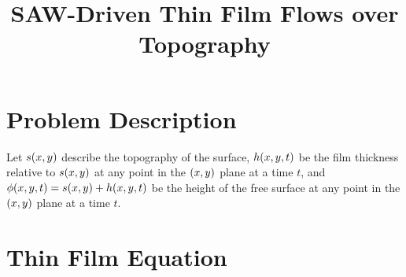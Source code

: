\documentclass[letterpaper]{article}
\title{SAW-Driven Thin Film Flows over Topography}
\date{}
\begin{document}
 
\maketitle

\section{Problem Description}

Let $s\!\left( x, y \right)$ describe the topography of the surface, 
$h\!\left( x,y,t \right)$ be the film thickness relative to $s\!\left( x,y \right)$ at any point in the $\left( x,y \right)$ plane at a time $t$, 
and $\phi\!\left( x,y,t \right) = s\!\left( x,y \right) + h\!\left( x,y,t \right)$ be the height of the free surface at any point in the $\left( x,y \right)$ plane at a time $t$.

\section{Thin Film Equation}

 
\newpage
\printbibliography
\end{document}
